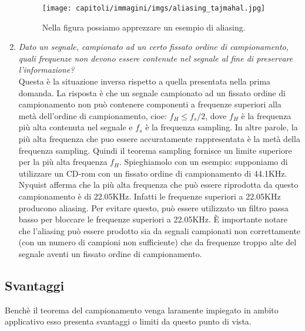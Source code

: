 \begin{enumerate}
          \begin{figure}[H]
              \centering
              \texttt{[image: capitoli/immagini/imgs/aliasing\_tajmahal.jpg]}
              \caption{Nella figura possiamo apprezzare un esempio di aliasing.}
          \end{figure}

    \item \textit{Dato un segnale, campionato ad un certo fissato ordine di campionamento,
              quali frequenze non devono essere contenute nel segnale al fine di preservare
              l’informazione?}\\

          Questa è la situazione inversa rispetto a quella presentata nella prima
          domanda. La risposta è che un segnale campionato ad un fissato ordine
          di campionamento non può contenere componenti a frequenze superiori
          alla metà dell’ordine di campionamento, cioe: $f_H \leq f_s/2$, dove
          $f_H$ è la frequenza più alta contenuta nel segnale e $f_s$ è la frequenza
          sampling. In altre parole, la più alta frequenza che puo essere accuratamente
          rappresentata è la metà della frequenza sampling. Quindi il teorema
          sampling fornisce un limite superiore per la più alta frequenza $f_H$.
          Spieghiamolo con un esempio: supponiamo di utilizzare un CD-rom con un
          fissato ordine di campionamento di 44.1KHz. Nyquist afferma che la più
          alta frequenza che può essere riprodotta da questo campionamento è di
          22.05KHz. Infatti le frequenze superiori a 22.05KHz producono aliasing.
          Per evitare questo, può essere utilizzato un filtro passa basso per bloccare
          le frequenze superiori a 22.05KHz. È importante notare che l’aliasing
          può essere prodotto sia da segnali campionati non correttamente (con
          un numero di campioni non sufficiente) che da frequenze troppo alte del
          segnale aventi un fissato ordine di campionamento.
\end{enumerate}

\subsection{Svantaggi}

Benchè il teorema del campionamento venga laramente impiegato in ambito applicativo
esso presenta svantaggi o limiti da questo punto di vista.

